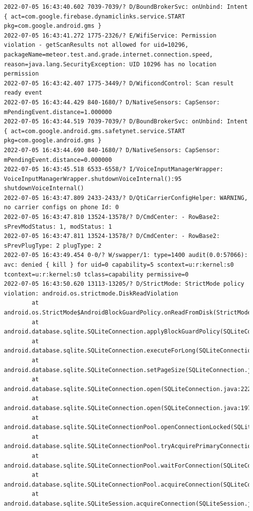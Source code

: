 \documentclass[a4paper,12pt]{book}
\begin{document}
\begin{lstlisting}
2022-07-05 16:43:40.602 7039-7039/? D/BoundBrokerSvc: onUnbind: Intent { act=com.google.firebase.dynamiclinks.service.START pkg=com.google.android.gms }
2022-07-05 16:43:41.272 1775-2326/? E/WifiService: Permission violation - getScanResults not allowed for uid=10296, packageName=meteor.test.and.grade.internet.connection.speed, reason=java.lang.SecurityException: UID 10296 has no location permission
2022-07-05 16:43:42.407 1775-3449/? D/WificondControl: Scan result ready event
2022-07-05 16:43:44.429 840-1680/? D/NativeSensors: CapSensor:  mPendingEvent.distance=1.000000
2022-07-05 16:43:44.519 7039-7039/? D/BoundBrokerSvc: onUnbind: Intent { act=com.google.android.gms.safetynet.service.START pkg=com.google.android.gms }
2022-07-05 16:43:44.690 840-1680/? D/NativeSensors: CapSensor:  mPendingEvent.distance=0.000000
2022-07-05 16:43:45.518 6533-6558/? I/VoiceInputManagerWrapper: VoiceInputManagerWrapper.shutdownVoiceInternal():95 shutdownVoiceInternal()
2022-07-05 16:43:47.809 2433-2433/? D/QtiCarrierConfigHelper: WARNING, no carrier configs on phone Id: 0
2022-07-05 16:43:47.810 13524-13578/? D/CmdCenter: - RowBase2: sPrevModStatus: 1, modStatus: 1
2022-07-05 16:43:47.811 13524-13578/? D/CmdCenter: - RowBase2: sPrevPlugType: 2 plugType: 2
2022-07-05 16:43:49.454 0-0/? W/swapper/1: type=1400 audit(0.0:57066): avc: denied { kill } for uid=0 capability=5 scontext=u:r:kernel:s0 tcontext=u:r:kernel:s0 tclass=capability permissive=0
2022-07-05 16:43:50.620 13113-13205/? D/StrictMode: StrictMode policy violation: android.os.strictmode.DiskReadViolation
        at android.os.StrictMode$AndroidBlockGuardPolicy.onReadFromDisk(StrictMode.java:1571)
        at android.database.sqlite.SQLiteConnection.applyBlockGuardPolicy(SQLiteConnection.java:1138)
        at android.database.sqlite.SQLiteConnection.executeForLong(SQLiteConnection.java:688)
        at android.database.sqlite.SQLiteConnection.setPageSize(SQLiteConnection.java:260)
        at android.database.sqlite.SQLiteConnection.open(SQLiteConnection.java:222)
        at android.database.sqlite.SQLiteConnection.open(SQLiteConnection.java:197)
        at android.database.sqlite.SQLiteConnectionPool.openConnectionLocked(SQLiteConnectionPool.java:505)
        at android.database.sqlite.SQLiteConnectionPool.tryAcquirePrimaryConnectionLocked(SQLiteConnectionPool.java:949)
        at android.database.sqlite.SQLiteConnectionPool.waitForConnection(SQLiteConnectionPool.java:699)
        at android.database.sqlite.SQLiteConnectionPool.acquireConnection(SQLiteConnectionPool.java:380)
        at android.database.sqlite.SQLiteSession.acquireConnection(SQLiteSession.java:896)

\end{lstlisting}
\end{document}
